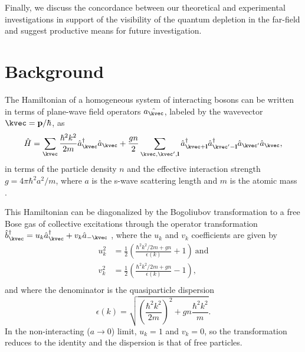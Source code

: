 	
	Finally, we discuss the concordance between our theoretical and experimental investigations in support of the visibility of the quantum depletion in the far-field and suggest productive means for future investigation.
	
\section{Background} 
	The Hamiltonian of a homogeneous system of interacting bosons can be written in terms of plane-wave field operators $\hat{a_\kvec}$, labeled by the wavevector $\kvec=\textbf{p}/\hbar$, as
	\begin{equation}
		\hat{H} = \sum_{\kvec} \frac{\hbar^2k^2}{2m}\hat{a}_{\kvec}^\dagger \hat{a}_\kvec + \frac{g n}{2}\sum_{\kvec,\kvec',{\bf l}}\hat{a}_{\kvec+{\bf l}}^\dagger\hat{a}_{\kvec'-{\bf l}}^\dagger \hat{a}_{\kvec'}\hat{a}_{\kvec},
	\end{equation}
	in terms of the particle density $n$ and the effective interaction strength $g=4\pi\hbar^2a^2/m$, where $a$ is the s-wave scattering length and $m$ is the atomic mass \cite{PitaevskiiStringari,PethickSmith}.
   
    This Hamiltonian can be diagonalized by the Bogoliubov transformation to a free Bose gas of collective excitations through the operator transformation $\hat{b}_{\kvec}^\dagger = u_k \hat{a}_\kvec^\dagger + v_k \hat{a}_{-\kvec}$ \cite{Bogolubov47,PethickSmith}, where the $u_k$ and $v_k$ coefficients are given by
	\begin{align}
		u_{k}^2 &= \frac{1}{2}\left(\frac{\hbar^2k^2/2m + gn}{\epsilon(k)} + 1\right)~\textrm{and}\\
		v_{k}^2 &= \frac{1}{2}\left(\frac{\hbar^2k^2/2m + gn}{\epsilon(k)} - 1\right),\\
	\end{align}
	and where the denominator is the quasiparticle dispersion
	\begin{equation}
		\epsilon(k) = \sqrt{\left(\frac{\hbar^2k^2}{2m}\right)^2 + gn\frac{ \hbar^2k^2}{m}}.
	\end{equation}
	In the non-interacting ($a\rightarrow0$) limit, $u_k=1$ and $v_k=0$, so the transformation reduces to the identity and the dispersion is that of free particles.
	
